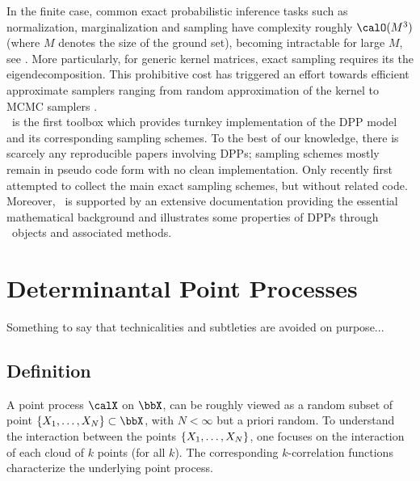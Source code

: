 \documentclass[twoside,11pt]{article}
\begin{document}
  In the finite case, common exact probabilistic inference tasks such as normalization, marginalization and sampling have complexity roughly $\calO(M^3)$ (where $M$ denotes the size of the ground set), becoming intractable for large $M$, see \citet{Gil14}.
  More particularly, for generic kernel matrices, exact sampling requires its the eigendecomposition.
  This prohibitive cost has triggered an effort towards efficient approximate samplers ranging from random approximation of the kernel \citep{AfKuFo13} to MCMC samplers \citep{AnGhRe16, LiJeSr16c, GaBaVa17}.\\

  \DPPy\ is the first toolbox which provides turnkey implementation of the DPP model and its corresponding sampling schemes.
  To the best of our knowledge, there is scarcely any reproducible papers involving DPPs; sampling schemes mostly remain in pseudo code form with no clean implementation.
  Only recently \citet{TrBaAm18} first attempted to collect the main exact sampling schemes, but without related code.
  Moreover, \DPPy\ is supported by an extensive documentation providing the essential mathematical background and illustrates some properties of DPPs through \DPPy\ objects and associated methods.


\section{Determinantal Point Processes} %
\label{sec:determinantal_point_processes}

  Something to say that technicalities and subtleties are avoided on purpose...

  \subsection{Definition} %
  \label{sub:definition}
  
    A point process $\calX$ on $\bbX$, can be roughly viewed as a random subset of point $\lrcb{X_1, \dots, X_N} \subset \bbX$, with $N<\infty$ but a priori random.
    To understand the interaction between the points $\left\{ X_1, \dots, X_N \right\}$, one focuses on the interaction of each cloud of $k$ points (for all $k$). 
    The corresponding $k$-correlation functions characterize the underlying point process.
\end{document}
